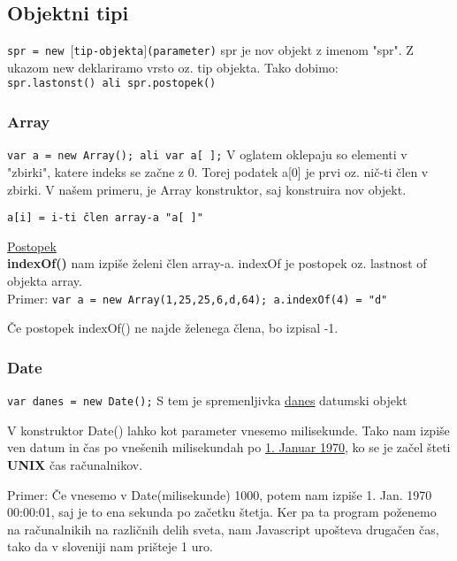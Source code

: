 \subsection{Objektni tipi}

\texttt{spr = new $[$tip-objekta$]$(parameter)}
spr je nov objekt z imenom "spr". Z ukazom new deklariramo vrsto oz. tip objekta. Tako dobimo:\\
\texttt{spr.lastonst() ali spr.postopek()}

\subsubsection*{Array}

\texttt{var a = new Array(); ali var a[ ];}
V oglatem oklepaju so elementi v "zbirki", katere indeks se začne z 0. Torej podatek a[0] je prvi oz. nič-ti člen v zbirki.
V našem primeru, je Array konstruktor, saj konstruira nov objekt.

\texttt{a[i] = i-ti člen array-a "a[ ]"}

\underline{Postopek}\\
\textbf{indexOf()} nam izpiše želeni člen array-a. indexOf je postopek oz. lastnost of objekta array.\\
Primer:
\texttt{var a = new Array(1,25,25,6,d,64); a.indexOf(4) = "d"}

Če postopek indexOf() ne najde želenega člena, bo izpisal -1.

\subsubsection*{Date}

\texttt{var danes = new Date();} S tem je spremenljivka \underline{danes} datumski objekt

V konstruktor Date() lahko kot parameter vnesemo milisekunde. Tako nam izpiše ven datum in čas po vnešenih milisekundah po \underline{1. Januar 1970}, ko se je začel šteti \textbf{UNIX} čas računalnikov.

Primer: Če vnesemo v Date(milisekunde) 1000, potem nam izpiše 1. Jan. 1970 00:00:01, saj je to ena sekunda po začetku štetja. Ker pa ta program poženemo na računalnikih na različnih delih sveta, nam Javascript upošteva drugačen čas, tako da v sloveniji nam prišteje 1 uro.

